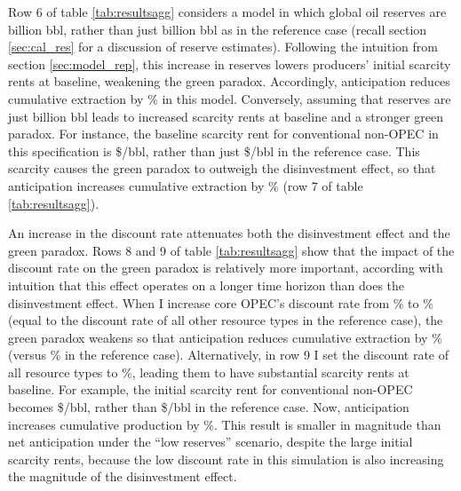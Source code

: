 \documentclass[12pt]{article}
\begin{document}
Row 6 of table \ref{tab:resultsagg} considers a model in which global oil reserves are billion bbl, rather than just billion bbl as in the reference case (recall section \ref{sec:cal_res} for a discussion of reserve estimates). Following the intuition from section \ref{sec:model_rep}, this increase in reserves lowers producers' initial scarcity rents at baseline, weakening the green paradox. Accordingly, anticipation reduces cumulative extraction by \unskip\% in this model. Conversely, assuming that reserves are just billion bbl leads to increased scarcity rents at baseline and a stronger green paradox. For instance, the baseline scarcity rent for conventional non-OPEC in this specification is \$\unskip/bbl, rather than just \$\unskip/bbl in the reference case. This scarcity causes the green paradox to outweigh the disinvestment effect, so that anticipation increases cumulative extraction by \unskip\% (row 7 of table \ref{tab:resultsagg}).

An increase in the discount rate attenuates both the disinvestment effect and the green paradox. Rows 8 and 9 of table \ref{tab:resultsagg} show that the impact of the discount rate on the green paradox is relatively more important, according with intuition that this effect operates on a longer time horizon than does the disinvestment effect. When I increase core OPEC's discount rate from \unskip\% to \unskip\% (equal to the discount rate of all other resource types in the reference case), the green paradox weakens so that anticipation reduces cumulative extraction by \unskip\% (versus \unskip\% in the reference case). Alternatively, in row 9 I set the discount rate of all resource types to \unskip\%, leading them to have substantial scarcity rents at baseline. For example, the initial scarcity rent for conventional non-OPEC becomes \$\unskip/bbl, rather than \$\unskip/bbl in the reference case. Now, anticipation increases cumulative production by \unskip\%. This result is smaller in magnitude than net anticipation under the ``low reserves'' scenario, despite the large initial scarcity rents, because the low discount rate in this simulation is also increasing the magnitude of the disinvestment effect.
\end{document}
